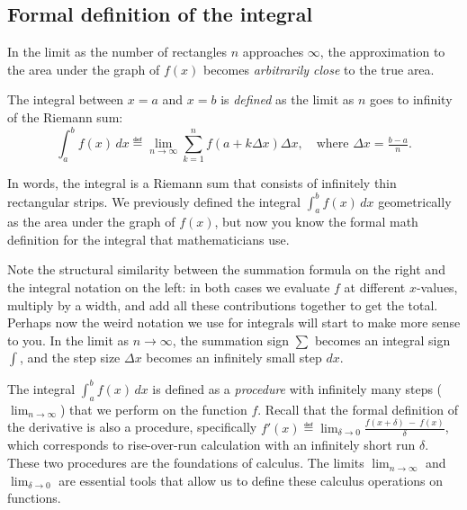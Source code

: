 	\subsection{Formal definition of the integral}

		In the limit as the number of rectangles $n$ approaches $\infty$,
		the approximation to the area under the graph of $f(x)$
		becomes \emph{arbitrarily close} to the true area.

		\vspace{-2mm}
		\begin{shadebox}
		\vspace{1mm}
		The integral between $x=a$ and $x=b$ is \emph{defined}
		as the limit as $n$ goes to infinity of the Riemann sum:
		\[
			\int_{a}^{b}\!f(x)\,dx 
				\eqdef \lim_{n\to\infty} \sum_{k=1}^{n} f(a + k\Delta x)\Delta x,
				\quad
				\text{where } \Delta x=\tfrac{b-a}{n}.
		\]
		\end{shadebox}

		\noindent
		In words,
		the integral is a Riemann sum
		that consists of infinitely thin rectangular strips.
		We previously defined the integral $\int_{a}^{b}f(x)\,dx$ geometrically
		as the area under the graph of $f(x)$, %
		but now you know the formal math definition for the integral that mathematicians use.

		Note the structural similarity between the summation formula on the right
		and the integral notation on the left:
		in both cases we evaluate $f$ at different $x$-values,
		multiply by a width,
		and add all these contributions together to get the total.
		Perhaps now the weird notation we use for integrals will start to make more sense to you.
		In the limit as $n\to \infty$,
		the summation sign $\sum$ becomes an integral sign $\int$,
		and the step size $\Delta x$ becomes an infinitely small step $dx$.

		The integral $\int_{a}^{b}\!f(x)\,dx$ is defined as a \emph{procedure}
		with infinitely many steps ($\lim_{n\to\infty}$)
		that we perform on the function $f$.
		Recall that the formal definition of the derivative is also a procedure,
		specifically $f'(x) \eqdef \lim_{\delta \to 0} \frac{f(x+\delta)\ - \ f(x)}{\delta}$,
		which corresponds to rise-over-run calculation with an infinitely short run $\delta$.
		These two procedures are the foundations of calculus.
		The limits $\lim_{n\to\infty}$ and $\lim_{\delta \to 0}$
		are essential tools that allow us to define these calculus operations on functions.


